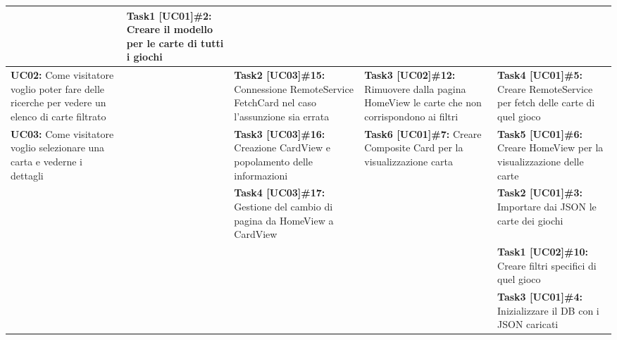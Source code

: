 \documentclass{article}
\begin{document}
\begin{itemize}
\begin{tabular}{ | p{2.4cm} | p{1.4cm} | p{2.7cm} | p{3.4cm} | p{3cm} | }
            & \textbf{Task1 [UC01]\#2:} Creare il modello per le carte di tutti i giochi \\
            \hline
            \textbf{UC02:} Come visitatore voglio poter fare delle ricerche per vedere un elenco di carte filtrato
            & & \textbf{Task2 [UC03]\#15:} Connessione RemoteService FetchCard nel caso l'assunzione sia errata
            & \textbf{Task3 [UC02]\#12:} Rimuovere dalla pagina HomeView le carte che non corrispondono ai filtri
            & \textbf{Task4 [UC01]\#5:} Creare RemoteService per fetch delle carte di quel gioco \\
            \hline
            \textbf{UC03:} Come visitatore voglio selezionare una carta e vederne i dettagli
            & & \textbf{Task3 [UC03]\#16:} Creazione CardView e popolamento delle informazioni
            & \textbf{Task6 [UC01]\#7:} Creare Composite Card per la visualizzazione carta
            & \textbf{Task5 [UC01]\#6:} Creare HomeView per la visualizzazione delle carte \\
            \hline
            & & \textbf{Task4 [UC03]\#17:} Gestione del cambio di pagina da HomeView a CardView
            & & \textbf{Task2 [UC01]\#3:} Importare dai JSON le carte dei giochi \\
            \hline
            & & & & \textbf{Task1 [UC02]\#10:} Creare filtri specifici di quel gioco  \\
            \hline
            & & & & \textbf{Task3 [UC01]\#4:} Inizializzare il DB con i JSON caricati \\
            \hline
        \end{tabular}
    \end{itemize}
\end{document}
